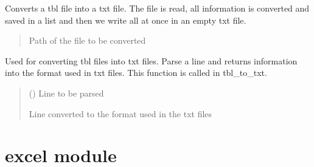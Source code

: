 \documentclass[letterpaper,10pt,english]{sphinxmanual}
\begin{document}

\begin{fulllineitems}
\label{\detokenize{converter:converter.tbl_to_txt}}
\pysigstartsignatures
{}
\pysigstopsignatures
\sphinxAtStartPar
Converts a tbl file into a txt file. The file is read, all information is converted and saved in a list and then we write all at once in an empty txt file.
\begin{quote}\begin{description}
\sphinxAtStartPar
{} \textendash{} Path of the file to be converted

\end{description}\end{quote}

\end{fulllineitems}


\begin{fulllineitems}
\label{\detokenize{converter:converter.traducer}}
\pysigstartsignatures
{}
\pysigstopsignatures
\sphinxAtStartPar
Used for converting tbl files into txt files. Parse a line and returns information into the format used in txt files.
This function is called in tbl\_to\_txt.
\begin{quote}\begin{description}
\sphinxAtStartPar
{} () \textendash{} Line to be parsed

\sphinxAtStartPar
Line converted to the format used in the txt files

\end{description}\end{quote}

\end{fulllineitems}


\sphinxstepscope


\chapter{excel module}
\label{\detokenize{excel:module-excel}}\label{\detokenize{excel:excel-module}}\label{\detokenize{excel::doc}}
\end{document}
